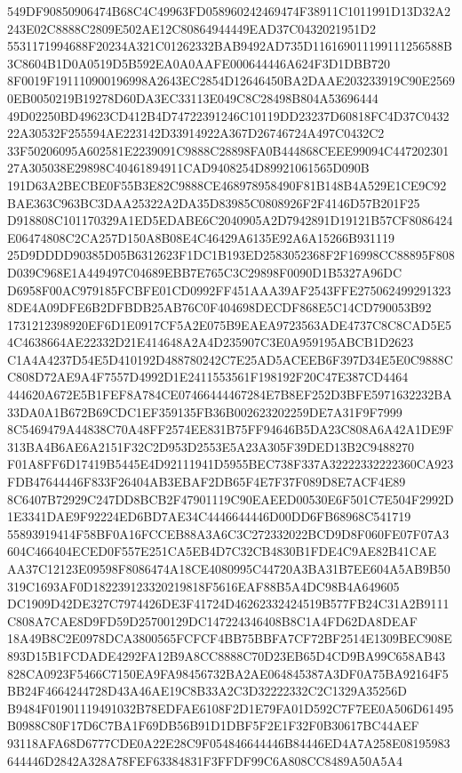 \documentclass[UTF8,fontset=fandol,zihao=-4,a4paper]{ctexart}
\begin{document}
{{549DF90850906474B68C4C49963FD058960242469474F38911C1011991D13D32A2243E02C8888C2809E502AE12C80864944449EAD37C0432021951D2
5531171994688F20234A321C01262332BAB9492AD735D116169011199111256588B3C8604B1D0A0519D5B592EA0A0AAFE000644446A624F3D1DBB720
8F0019F191110900196998A2643EC2854D12646450BA2DAAE203233919C90E25690EB0050219B19278D60DA3EC33113E049C8C28498B804A53696444
49D02250BD49623CD412B4D74722391246C10119DD23237D60818FC4D37C043222A30532F255594AE223142D33914922A367D26746724A497C0432C2
33F50206095A602581E2239091C9888C28898FA0B444868CEEE99094C44720230127A305038E29898C40461894911CAD9408254D89921061565D090B
191D63A2BECBE0F55B3E82C9888CE468978958490F81B148B4A529E1CE9C92BAE363C963BC3DAA25322A2DA35D83985C0808926F2F4146D57B201F25
D918808C101170329A1ED5EDABE6C2040905A2D7942891D19121B57CF8086424E06474808C2CA257D150A8B08E4C46429A6135E92A6A15266B931119
25D9DDDD90385D05B6312623F1DC1B193ED2583052368F2F16998CC88895F808D039C968E1A449497C04689EBB7E765C3C29898F0090D1B5327A96DC
D6958F00AC979185FCBFE01CD0992FF451AAA39AF2543FFE2750624992913238DE4A09DFE6B2DFBDB25AB76C0F404698DECDF868E5C14CD790053B92
1731212398920EF6D1E0917CF5A2E075B9EAEA9723563ADE4737C8C8CAD5E54C4638664AE22332D21E414648A2A4D235907C3E0A959195ABCB1D2623
C1A4A4237D54E5D410192D488780242C7E25AD5ACEEB6F397D34E5E0C9888CC808D72AE9A4F7557D4992D1E2411553561F198192F20C47E387CD4464
444620A672E5B1FEF8A784CE07466444467284E7B8EF252D3BFE5971632232BA33DA0A1B672B69CDC1EF359135FB36B002623202259DE7A31F9F7999
8C5469479A44838C70A48FF2574EE831B75FF94646B5DA23C808A6A42A1DE9F313BA4B6AE6A2151F32C2D953D2553E5A23A305F39DED13B2C9488270
F01A8FF6D17419B5445E4D92111941D5955BEC738F337A32222332222360CA923FDB47644446F833F26404AB3EBAF2DB65F4E7F37F089D8E7ACF4E89
8C6407B72929C247DD8BCB2F47901119C90EAEED00530E6F501C7E504F2992D1E3341DAE9F92224ED6BD7AE34C4446644446D00DD6FB68968C541719
55893919414F58BF0A16FCCEB88A3A6C3C272332022BCD9D8F060FE07F07A3604C466404ECED0F557E251CA5EB4D7C32CB4830B1FDE4C9AE82B41CAE
AA37C12123E09598F8086474A18CE4080995C44720A3BA31B7EE604A5AB9B50319C1693AF0D182239123320219818F5616EAF88B5A4DC98B4A649605
DC1909D42DE327C7974426DE3F41724D46262332424519B577FB24C31A2B9111C808A7CAE8D9FD59D25700129DC147224346408B8C1A4FD62DA8DEAF
18A49B8C2E0978DCA3800565FCFCF4BB75BBFA7CF72BF2514E1309BEC908E893D15B1FCDADE4292FA12B9A8CC8888C70D23EB65D4CD9BA99C658AB43
828CA0923F5466C7150EA9FA98456732BA2AE064845387A3DF0A75BA92164F5BB24F4664244728D43A46AE19C8B33A2C3D32222332C2C1329A35256D
B9484F01901119491032B78EDFAE6108F2D1E79FA01D592C7F7EE0A506D61495B0988C80F17D6C7BA1F69DB56B91D1DBF5F2E1F32F0B30617BC44AEF
93118AFA68D6777CDE0A22E28C9F054846644446B84446ED4A7A258E08195983644446D2842A328A78FEF63384831F3FFDF99C6A808CC8489A50A5A4
}}
\end{document}
